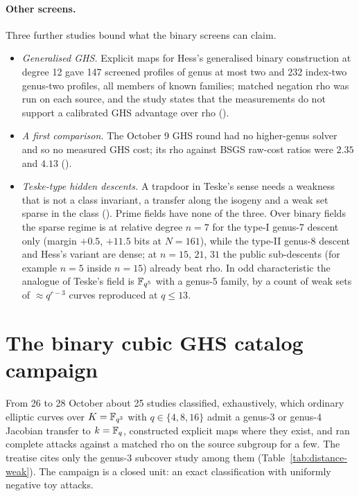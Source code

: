 \paragraph{Other screens.} Three further studies bound what the binary
screens can claim.
\begin{itemize}
\item \emph{Generalised GHS.} Explicit maps for Hess's generalised binary
  construction at degree 12 gave 147 screened profiles of genus at most two
  and 232 index-two genus-two profiles, all members of known families;
  matched negation rho was run on each source, and the study states that
  the measurements do not support a calibrated GHS advantage over rho
  ().
\item \emph{A first comparison.} The October 9 GHS round had no higher-genus
  solver and so no measured GHS cost; its rho against BSGS raw-cost ratios
  were $2.35$ and $4.13$ ().
\item \emph{Teske-type hidden descents.} A trapdoor in Teske's sense needs a
  weakness that is not a class invariant, a transfer along the isogeny and
  a weak set sparse in the class
  (). Prime
  fields have none of the three. Over binary fields the sparse regime is at
  relative degree $n=7$ for the type-I genus-7 descent only (margin $+0.5$,
  $+11.5$ bits at $N=161$), while the type-II genus-8 descent and Hess's
  variant are dense; at $n=15$, $21$, $31$ the public sub-descents (for
  example $n=5$ inside $n=15$) already beat rho. In odd characteristic the
  analogue of Teske's field is $\mathbb{F}_{q^5}$ with a genus-5 family, by a
  count of weak sets of $\approx q^{r-3}$ curves reproduced at $q\le13$.
\end{itemize}

\section{The binary cubic GHS catalog campaign}\label{sec:ghs-catalog}

From 26 to 28 October about 25 studies classified, exhaustively, which
ordinary elliptic curves over $K=\mathbb{F}_{q^3}$ with $q\in\{4,8,16\}$ admit a
genus-3 or genus-4 Jacobian transfer to $k=\mathbb{F}_q$, constructed explicit maps
where they exist, and ran complete attacks against a matched rho on the
source subgroup for a few. The treatise cites only the genus-3 subcover
study among them (Table~\ref{tab:distance-weak}). The campaign is a closed
unit: an exact classification with uniformly negative toy attacks.

